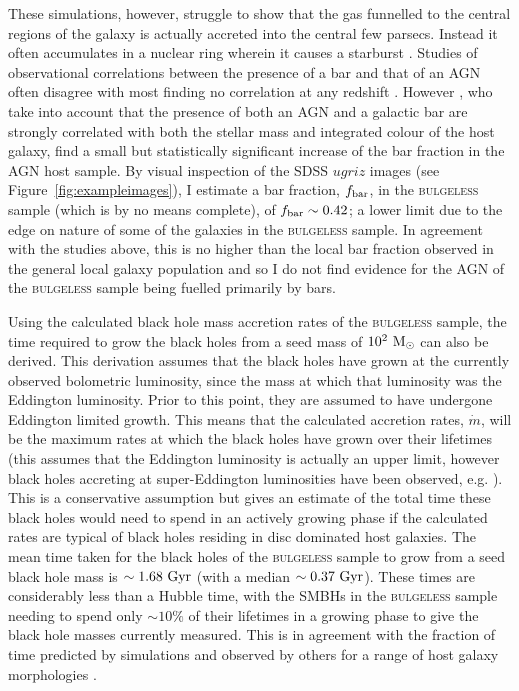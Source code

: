 {These simulations, however, struggle to show that the gas funnelled to the central regions of the galaxy is actually accreted into the central few parsecs. Instead it often accumulates in a nuclear ring wherein it causes a starburst \citep{regan04}. Studies of observational correlations between the presence of a bar and that of an AGN often disagree with most finding no correlation at any redshift \citep{ho97, malkan98, erwin02, lee12,cisternas13, cheung15}. However \cite{galloway15}, who take into account that the presence of both an AGN and a galactic bar are strongly correlated with both the stellar mass and integrated colour of the host galaxy, find a small but statistically significant increase of the bar fraction in the AGN host sample. By visual inspection of the SDSS $ugriz$ images (see Figure~\ref{fig:exampleimages}), I estimate a bar fraction, $f_{\rm{bar}}$, in the \textsc{bulgeless} sample (which is by no means complete), of $f_{\rm{bar}} \sim 0.42$; a lower limit due to the edge on nature of some of the galaxies in the \textsc{bulgeless} sample. In agreement with the studies above, this is no higher than the local bar fraction observed in the general local galaxy population \citep{masters11a} and so I do not find evidence for the AGN of the \textsc{bulgeless} sample being fuelled primarily by bars.

Using the calculated black hole mass accretion rates of the \textsc{bulgeless} sample, the time required to grow the black holes from a seed mass of $10^2 ~\rm{M}_{\odot}$ \citep{volonteri08} can also be derived. This derivation assumes that the black holes have grown at the currently observed bolometric luminosity, since the mass at which that luminosity was the Eddington luminosity. Prior to this point, they are assumed to have undergone Eddington limited growth. This means that the calculated accretion rates, $\dot{m}$, will be the maximum rates at which the black holes have grown over their lifetimes (this assumes that the Eddington luminosity is actually an upper limit, however black holes accreting at super-Eddington luminosities have been observed, e.g. \citealt{lanzuisi16, pintore16, soria16}). This is a conservative assumption but gives an estimate of the total time these black holes would need to spend in an actively growing phase if the calculated rates are typical of black holes residing in disc dominated host galaxies. The mean time taken for the black holes of the \textsc{bulgeless} sample to grow from a seed black hole mass is $\sim 1.68 ~\rm{Gyr}$ (with a median $\sim 0.37 ~\rm{Gyr}$). These times are considerably less than a Hubble time, with the SMBHs in the \textsc{bulgeless} sample needing to spend only $\sim 10\%$ of their lifetimes in a growing phase to give the black hole masses currently measured. This is in agreement with the fraction of time predicted by simulations and observed by others for a range of host galaxy morphologies \citep{kauffmann03, hao05, hopkins06, fiore12, Simmons13}.

}
